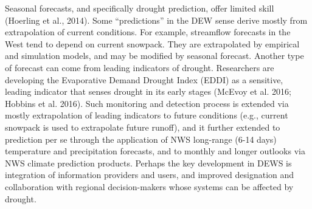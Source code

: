 \documentclass[11pt]{article}
\begin{document}
Seasonal forecasts, and specifically drought prediction, offer limited skill (Hoerling et al., 2014). Some ``predictions'' in the DEW sense derive mostly from extrapolation of current conditions. 
For example, streamflow forecasts in the West tend to depend on current snowpack. 
They are extrapolated by empirical and simulation models, and may be modified by seasonal forecast.
Another type of forecast can come from leading indicators of drought. Researchers are developing the Evaporative Demand Drought Index (EDDI) as a sensitive, leading indicator that senses drought in its early stages (McEvoy et al. 2016; Hobbins et al. 2016). 
Such monitoring and detection process
 is extended via mostly extrapolation of leading indicators to future conditions (e.g., current snowpack is used to extrapolate future runoff), and it further extended to prediction per se through the application of NWS long-range (6-14 days) temperature and precipitation forecasts, and to monthly and longer outlooks via NWS climate prediction products.  
Perhaps the key development in DEWS is integration of information providers and users, and improved designation and collaboration with regional decision-makers whose systems can be affected by drought. 
\end{document}
